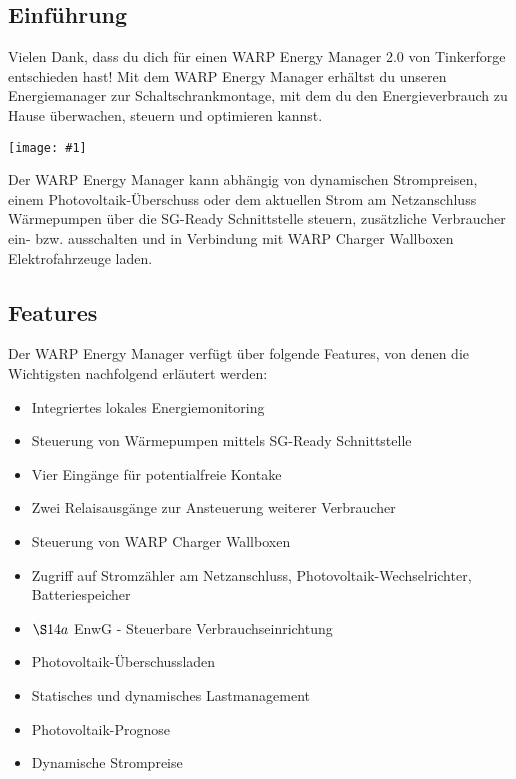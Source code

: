 \documentclass[a4paper,10pt]{article}
\newcommand{\gfx}[1]{\texttt{[image: \#1]}}
\begin{document}
\begin{multicols*}{2}
	\tableofcontents
	\newpage
	\section{Einführung}
	Vielen Dank, dass du dich für einen WARP Energy Manager 2.0 von Tinkerforge entschieden hast!
	Mit dem WARP Energy Manager
	erhältst du unseren Energiemanager zur Schaltschrankmontage, mit dem du den
	Energieverbrauch zu Hause überwachen, steuern und optimieren kannst.

	\gfx{./img/resized/warp-energy-manager.png}

	Der WARP Energy Manager kann abhängig von dynamischen Strompreisen, einem Photovoltaik-Überschuss oder dem aktuellen Strom am Netzanschluss
    Wärmepumpen über die SG-Ready Schnittstelle steuern, zusätzliche Verbraucher ein- bzw. ausschalten und in Verbindung mit WARP Charger Wallboxen 
    Elektrofahrzeuge laden.

	\subsection{Features}
	Der WARP Energy Manager verfügt über folgende Features, von denen die Wichtigsten nachfolgend erläutert werden:
    
    \begin{itemize}
        \item Integriertes lokales Energiemonitoring
        \item Steuerung von Wärmepumpen mittels SG-Ready Schnittstelle
        \item Vier Eingänge für potentialfreie Kontake
        \item Zwei Relaisausgänge zur Ansteuerung weiterer Verbraucher
        \item Steuerung von WARP Charger Wallboxen
        \item Zugriff auf Stromzähler am Netzanschluss, Photovoltaik-Wechselrichter, Batteriespeicher
        \item $\S14a$ EnwG - Steuerbare Verbrauchseinrichtung
        \item Photovoltaik-Überschussladen
        \item Statisches und dynamisches Lastmanagement
        \item Photovoltaik-Prognose
        \item Dynamische Strompreise
    \end{itemize}
    

\end{multicols*}
\end{document}
